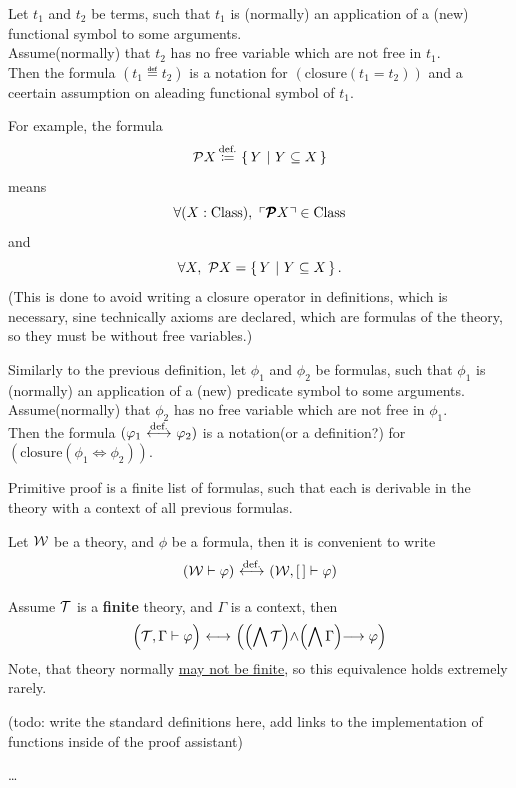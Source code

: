 \begin{metadefinition}
\begin{metadefinition}
Let $t_1$ and $t_2$ be terms, such that $t_1$ is (normally) an application of a (new) functional symbol to some arguments.\\
Assume(normally) that $t_2$ has no free variable which are not free in $t_1$.\\
Then the formula $(t_1 \eqdef t_2)$ is a notation for $(\text{closure}(t_1 = t_2))$ and a ceertain assumption on aleading functional symbol of $t_1$.
\end{metadefinition}
\begin{example}
For example, the formula
\[
\mathcal{P} X \,{\stackrel{{\textrm{def.}}}{\coloneqq}}\, \left\{\,Y\ \middle|\ Y\subseteq X\,\right\}
\]
means
\[
\forall (X:{\text{Class}}),\ \ulcorner\pmb{\mathcal{P}} X\urcorner \in{\text{Class}}
\]
and
\[
\forall X,\ \mathcal{P} X = \left\{\,Y\ \middle|\ Y\subseteq X\,\right\}.
\]
(This is done to avoid writing a closure operator in definitions, which is necessary, sine technically axioms are declared, which are formulas of the theory, so they must be without free variables.)
\end{example}

\begin{metadefinition}
Similarly to the previous definition, let $\phi_1$ and $\phi_2$ be formulas, such that $\phi_1$ is (normally) an application of a (new) predicate symbol to some arguments.\\
Assume(normally) that $\phi_2$ has no free variable which are not free in $\phi_1$.\\
Then the formula $(\varphi_1 \ {\stackrel{{\textrm{def.}}}{\longleftrightarrow}}\  \varphi_2)$ is a notation(or a definition?) for $(\text{closure}(\phi_1 \iff \phi_2))$.
\end{metadefinition}

\begin{definition}%
Primitive proof is a finite list of formulas, such that each is derivable in the theory with a context of all previous formulas.
\end{definition}
\begin{notation}
Let ${\mathcal{W}}$ be a theory, and $\phi$ be a formula, then it is convenient to write
\[
({\mathcal{W}} \vdash \varphi) \ {\stackrel{{\textrm{def.}}}{\longleftrightarrow}}\  ({\mathcal{W}}, [\,] \vdash \varphi)
\]
\end{notation}

\begin{example}
Assume $\mathcal{T}$ is a \textbf{finite} theory, and $\Gamma$ is a context, then
\[
\left(\mathcal{T},\Gamma\vdash \varphi\middle) {\ \longleftrightarrow\ } \middle(\middle(\bigwedge \mathcal{T}\middle)\land \middle(\bigwedge \Gamma\middle)\longrightarrow \varphi\right)
\]
Note, that theory normally \underline{may not be finite}, so this equivalence holds extremely rarely. %
\end{example}


(todo: write the standard definitions here, add links to the implementation of functions inside of the proof assistant)
\end{metadefinition}
\dots\\

